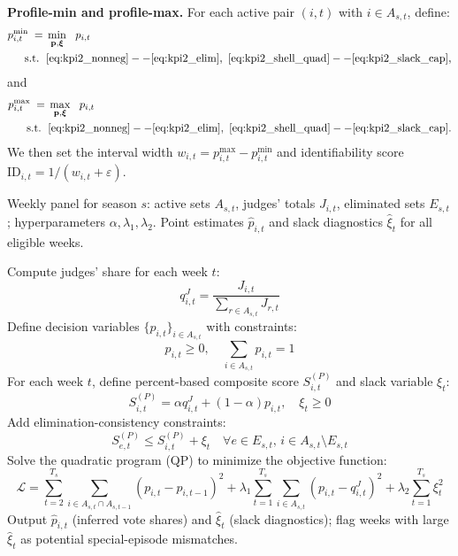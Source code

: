 \textbf{Profile-min and profile-max.}
For each active pair $(i,t)$ with $i\in A_{s,t}$, define:
\begin{align}
p^{\min}_{i,t} \;=\;& \min_{\mathbf{p},\boldsymbol{\xi}}\ \ p_{i,t} \label{eq:kpi2_profile_min}\\
\text{s.t.}\ \;& \eqref{eq:kpi2_nonneg}--\eqref{eq:kpi2_elim},\ \eqref{eq:kpi2_shell_quad}--\eqref{eq:kpi2_slack_cap}, \nonumber
\end{align}
and
\begin{align}
p^{\max}_{i,t} \;=\;& \max_{\mathbf{p},\boldsymbol{\xi}}\ \ p_{i,t} \label{eq:kpi2_profile_max}\\
\text{s.t.}\ \;& \eqref{eq:kpi2_nonneg}--\eqref{eq:kpi2_elim},\ \eqref{eq:kpi2_shell_quad}--\eqref{eq:kpi2_slack_cap}. \nonumber
\end{align}
We then set the interval width $w_{i,t}=p^{\max}_{i,t}-p^{\min}_{i,t}$ and identifiability score $\mathrm{ID}_{i,t}=1/(w_{i,t}+\varepsilon)$.
\begin{algorithm}[H]
\caption{Season-wise fan vote inference via constrained QP}
\label{alg:qp_inference}
\small  %
\begin{algorithmic}[1]  %
    \Require 
        Weekly panel for season $s$: active sets $A_{s,t}$, judges' totals $J_{i,t}$, eliminated sets $E_{s,t}$; hyperparameters $\alpha,\lambda_1,\lambda_2$.
    \Ensure 
        Point estimates $\hat p_{i,t}$ and slack diagnostics $\hat \xi_t$ for all eligible weeks.

    \State Compute judges' share for each week $t$: 
    \[
    q^J_{i,t} = \frac{J_{i,t}}{\sum_{r\in A_{s,t}} J_{r,t}}
    \]
    \State Define decision variables $\{p_{i,t}\}_{i\in A_{s,t}}$ with constraints:
    \[
    p_{i,t} \ge 0, \quad \sum_{i\in A_{s,t}} p_{i,t} = 1
    \]
    \State For each week $t$, define percent-based composite score $S^{(P)}_{i,t}$ and slack variable $\xi_t$:
    \[
    S^{(P)}_{i,t} = \alpha q^{J}_{i,t} + (1-\alpha)p_{i,t}, \quad \xi_t \ge 0
    \]
    \State Add elimination-consistency constraints:
    \[
    S^{(P)}_{e,t} \le S^{(P)}_{i,t} + \xi_t \quad \forall e\in E_{s,t}, \, i\in A_{s,t}\setminus E_{s,t}
    \]
    \State Solve the quadratic program (QP) to minimize the objective function:
    \[
    \mathcal{L} = \sum_{t=2}^{T_s}\sum_{i\in A_{s,t}\cap A_{s,t-1}} (p_{i,t}-p_{i,t-1})^2 + \lambda_1\sum_{t=1}^{T_s}\sum_{i\in A_{s,t}}(p_{i,t}-q^J_{i,t})^2 + \lambda_2\sum_{t=1}^{T_s}\xi_t^2
    \]
    \State Output $\hat p_{i,t}$ (inferred vote shares) and $\hat \xi_t$ (slack diagnostics); flag weeks with large $\hat \xi_t$ as potential special-episode mismatches.
\end{algorithmic}
\end{algorithm}



